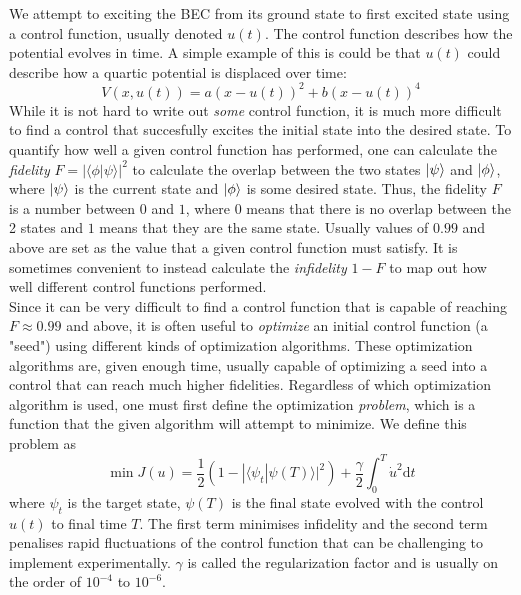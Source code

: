 \documentclass[a4paper, twocolumn]{revtex4-1}
\begin{document}
We attempt to exciting the BEC from its ground state to first excited state using a control function, usually denoted $u(t)$. The control function describes how the potential evolves in time. A simple example of this is could be that $u(t)$ could describe how a quartic potential is displaced over time:
\begin{equation}
	V(x, u(t)) = a(x-u(t))^2 + b(x-u(t))^4
\end{equation}
While it is not hard to write out \textit{some} control function, it is much more difficult to find a control that succesfully excites the initial state into the desired state. To quantify how well a given control function has performed, one can calculate the \textit{fidelity} $F = | \langle \phi | \psi \rangle |^2$ to calculate the overlap between the two states $\ket{\psi}$ and $\ket{\phi}$, where $\ket{\psi}$ is the current state and $\ket{\phi}$ is some desired state. Thus, the fidelity $F$ is a number between $0$ and $1$, where $0$ means that there is no overlap between the 2 states and $1$ means that they are the same state. Usually values of $0.99$ and above are set as the value that a given control function must satisfy. It is sometimes convenient to instead calculate the \textit{infidelity} $1-F$ to map out how well different control functions performed.\\

Since it can be very difficult to find a control function that is capable of reaching $F\approx 0.99$ and above, it is often useful to \textit{optimize} an initial control function (a "seed") using different kinds of optimization algorithms. These optimization algorithms are, given enough time, usually capable of optimizing a seed into a control that can reach much higher fidelities. Regardless of which optimization algorithm is used, one must first define the optimization \textit{problem}, which is a function that the given algorithm will attempt to minimize. We define this problem as\cite{JensJacobPhDThesis} 
\begin{equation}
	\min J(u) = \frac{1}{2}(1-| \langle \psi_{t} | \psi(T) \rangle|^2) + \frac{\gamma}{2} \int_{0}^{T} \dot{u}^2 \text{d}t
\end{equation}
where $\psi_{t}$ is the target state, $\psi(T)$ is the final state evolved with the control $u(t)$ to final time $T$. The first term minimises infidelity and the second term penalises rapid fluctuations of the control function that can be challenging to implement experimentally. $\gamma$ is called the regularization factor and is usually on the order of $10^{-4}$ to $10^{-6}$. \\
\end{document}
